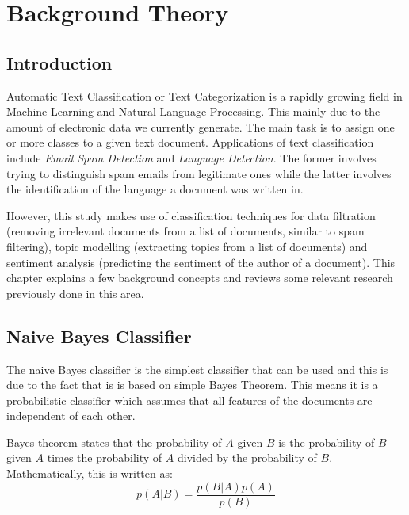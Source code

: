 
\chapter{Background Theory}

\label{ch:background}

\section{Introduction}
\label{sec:background_introduction}

Automatic Text Classification or Text Categorization is a rapidly growing field in Machine Learning
and Natural Language Processing. This mainly due to the amount of electronic data we currently
generate. The main task is to assign one or more classes to a given text document. Applications of
text classification include \textit{Email Spam Detection} and \textit{Language
Detection}. The former involves trying to distinguish spam emails from legitimate ones while the
latter involves the identification of the language a document was written in.

However, this study makes use of classification techniques for data filtration (removing irrelevant
documents from a list of documents, similar to spam filtering), topic modelling (extracting topics
from a list of documents) and sentiment analysis (predicting the sentiment of the author of a
document). This chapter explains a few background concepts and reviews some relevant research
previously done in this area.

\section{Naive Bayes Classifier}
\label{sec:bg_text_classification}
The naive Bayes classifier is the simplest classifier that can be used and this is due to the fact
that is is based on simple Bayes Theorem. This means it is a probabilistic classifier which
assumes that all features of the documents are independent of each other.

Bayes theorem states that the probability of $A$ given $B$ is the probability of $B$ given $A$ times
the probability of $A$ divided by the probability of $B$. Mathematically, this is written as:
\begin{equation}
  p(A|B) = \frac{p(B|A)p(A)}{p(B)}
\end{equation}

